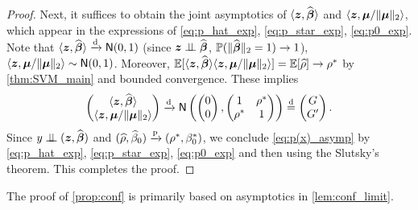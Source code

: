 \begin{proof}
    Next, it suffices to obtain the joint asymptotics of $\langle \text{\boldmath $z$}, \widehat{{\boldsymbol{\beta}}} \rangle$ and $\langle \text{\boldmath $z$}, \text{\boldmath $\mu$}/\|\text{\boldmath $\mu$}\|_2 \rangle$, which appear in the expressions of \cref{eq:p_hat_exp}, \eqref{eq:p_star_exp}, \eqref{eq:p0_exp}. Note that $\langle \text{\boldmath $z$}, \widehat{{\boldsymbol{\beta}}} \rangle \xrightarrow{\mathrm{d}} {\sf N}(0, 1)$ (since $\text{\boldmath $z$} \perp\!\!\!\perp \widehat{{\boldsymbol{\beta}}}$, $\mathbb{P}(\| \widehat{{\boldsymbol{\beta}}} \|_2 = 1) \to 1$), $\langle \text{\boldmath $z$}, \text{\boldmath $\mu$}/\|\text{\boldmath $\mu$}\|_2 \rangle \sim {\sf N}(0, 1)$. Moreover, $\mathbb{E}[\langle \text{\boldmath $z$}, \widehat{{\boldsymbol{\beta}}} \rangle \langle \text{\boldmath $z$}, \text{\boldmath $\mu$}/\|\text{\boldmath $\mu$}\|_2 \rangle ] = \mathbb{E}[ \widehat\rho ] \to \rho^*$ by \cref{thm:SVM_main} and bounded convergence. These implies
    \begin{equation*}
        \begin{pmatrix}
            \langle \text{\boldmath $z$}, \widehat{{\boldsymbol{\beta}}} \rangle \\
            \langle \text{\boldmath $z$}, \text{\boldmath $\mu$}/\|\text{\boldmath $\mu$}\|_2 \rangle
        \end{pmatrix}
        \xrightarrow{\mathrm{d}}
        {\sf N}\left(
        \begin{pmatrix}
            0 \\
            0
        \end{pmatrix},
        \begin{pmatrix}
            1 & \rho^* \\
            \rho^* & 1
        \end{pmatrix}
        \right) \overset{\mathrm{d}}{=} 
        \begin{pmatrix}
            G \\
            G'
        \end{pmatrix}.
    \end{equation*}
    Since $y \perp\!\!\!\perp (\text{\boldmath $z$}, \widehat{{\boldsymbol{\beta}}})$ and $(\widehat\rho, \widehat\beta_0) \xrightarrow{\mathrm{p}} (\rho^*, \beta_0^*)$, we conclude \cref{eq:p(x)_asymp} by \cref{eq:p_hat_exp}, \eqref{eq:p_star_exp}, \eqref{eq:p0_exp} and then using the Slutsky's theorem. This completes the proof.
\end{proof}


The proof of \cref{prop:conf} is primarily based on asymptotics in \cref{lem:conf_limit}.

